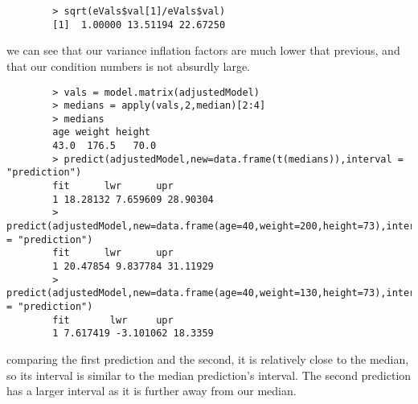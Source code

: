 \documentclass[12pt]{article}
\begin{document}
\begin{enumerate}
\begin{verbatim}
		> sqrt(eVals$val[1]/eVals$val)
		[1]  1.00000 13.51194 22.67250
		\end{verbatim}
		we can see that our variance inflation factors are much lower that previous, and that our condition numbers is not absurdly large.
		\begin{verbatim}
		> vals = model.matrix(adjustedModel)
		> medians = apply(vals,2,median)[2:4]
		> medians
		age weight height 
		43.0  176.5   70.0 
		> predict(adjustedModel,new=data.frame(t(medians)),interval = "prediction")
		fit      lwr      upr
		1 18.28132 7.659609 28.90304
		> predict(adjustedModel,new=data.frame(age=40,weight=200,height=73),interval = "prediction")
		fit      lwr      upr
		1 20.47854 9.837784 31.11929
		> predict(adjustedModel,new=data.frame(age=40,weight=130,height=73),interval = "prediction")
		fit       lwr     upr
		1 7.617419 -3.101062 18.3359
		\end{verbatim}
		comparing the first prediction and the second, it is relatively close to the median, so its interval is similar to the median prediction's interval.
		The second prediction has a larger interval as it is further away from our median.
		
		
	\end{enumerate}
	
\end{document}
